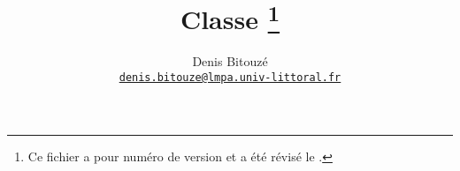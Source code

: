 \title{Classe \yat\thanks{Ce fichier a pour numéro de version \fileversion{} et
    a été révisé le \filedate.}%
}
%
\author{%
  Denis Bitouzé\\
  \texorpdfstring{%
    \href{mailto:denis.bitouze@lmpa.univ-littoral.fr}%
    {\nolinkurl{denis.bitouze@lmpa.univ-littoral.fr}}%
  }{%
    denis.bitouze@lmpa.univ-littoral.fr%
  }%
}
%
\maketitle

\iffalse
\fi
